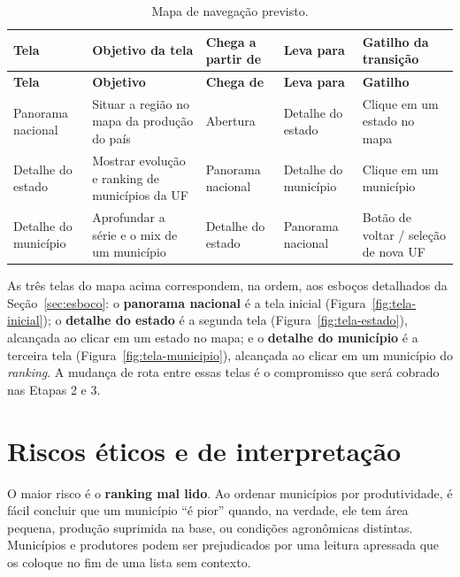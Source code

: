 \documentclass[11pt,a4paper]{article}
\begin{document}
\begin{longtable}{L{2.8cm} L{4.0cm} L{2.6cm} L{2.6cm} L{2.6cm}}
\caption{Mapa de navegação previsto.}\label{tab:navegacao}\\
\toprule
\textbf{Tela} & \textbf{Objetivo da tela} & \textbf{Chega a partir de} & \textbf{Leva para} & \textbf{Gatilho da transição}\\
\midrule
\endfirsthead
\toprule
\textbf{Tela} & \textbf{Objetivo} & \textbf{Chega de} & \textbf{Leva para} & \textbf{Gatilho}\\
\midrule
\endhead
\bottomrule
\endfoot
Panorama nacional & Situar a região no mapa da produção do país & Abertura & Detalhe do estado & Clique em um estado no mapa\\
\addlinespace
Detalhe do estado & Mostrar evolução e ranking de municípios da UF & Panorama nacional & Detalhe do município & Clique em um município\\
\addlinespace
Detalhe do município & Aprofundar a série e o mix de um município & Detalhe do estado & Panorama nacional & Botão de voltar / seleção de nova UF\\
\end{longtable}

As três telas do mapa acima correspondem, na ordem, aos esboços detalhados da
Seção~\ref{sec:esboco}: o \textbf{panorama nacional} é a tela inicial
(Figura~\ref{fig:tela-inicial}); o \textbf{detalhe do estado} é a segunda tela
(Figura~\ref{fig:tela-estado}), alcançada ao clicar em um estado no mapa; e o
\textbf{detalhe do município} é a terceira tela (Figura~\ref{fig:tela-municipio}), alcançada
ao clicar em um município do \textit{ranking}. A mudança de rota entre essas telas é o
compromisso que será cobrado nas Etapas 2 e 3.

\section{Riscos éticos e de interpretação}

O maior risco é o \textbf{ranking mal lido}. Ao ordenar municípios por produtividade, é fácil
concluir que um município ``é pior'' quando, na verdade, ele tem área pequena, produção
suprimida na base, ou condições agronômicas distintas. Municípios e produtores podem ser
prejudicados por uma leitura apressada que os coloque no fim de uma lista sem contexto.
\end{document}
